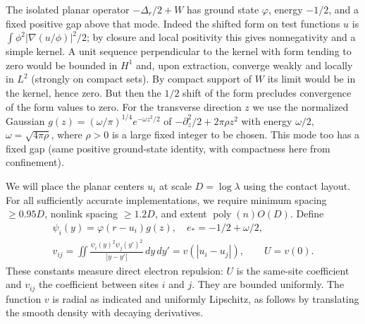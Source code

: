 The isolated planar operator \(-\Delta_r/2+W\) has ground state \(\varphi\), energy \(-1/2\), and a fixed positive gap above that mode. Indeed the shifted form on test functions \(u\) is \(\int \phi^2 |\nabla(u/\phi)|^2/2\); by closure and local positivity this gives nonnegativity and a simple kernel. A unit sequence perpendicular to the kernel with form tending to zero would be bounded in \(H^1\) and, upon extraction, converge weakly and locally in \(L^2\) (strongly on compact sets). By compact support of \(W\) its limit would be in the kernel, hence zero. But then the \(1/2\) shift of the form precludes convergence of the form values to zero. For the transverse direction \(z\) we use the normalized Gaussian \(g(z)=(\omega/\pi)^{1/4}e^{-\omega z^2/2}\) of \(-\partial_z^2/2+2\pi\rho z^2\) with energy \(\omega/2\), \(\omega=\sqrt{4\pi\rho}\), where \(\rho>0\) is a large fixed integer to be chosen. This mode too has a fixed gap (same positive ground-state identity, with compactness here from confinement).

We will place the planar centers \(u_i\) at scale \(D=\log\lambda\) using the contact layout. For all sufficiently accurate implementations, we require minimum spacing \(\ge0.95D\), nonlink spacing \(\ge1.2D\), and extent \(\operatorname{poly}(n) O(D)\). Define
\[
 \begin{gathered}
 \psi_i(y)=\varphi(r-u_i) g(z),\quad e_*=-1/2+\omega/2,\\
 v_{ij}=\iint\frac{\psi_i(y)^2\psi_j(y')^2}{|y-y'|}\,dy\,dy'
       =v(|u_i-u_j|),\qquad U=v(0).
 \end{gathered}
\]
These constants measure direct electron repulsion: $U$ is the same-site
coefficient and $v_{ij}$ the coefficient between sites $i$ and $j$.
They are bounded uniformly. The function \(v\) is radial as indicated
and uniformly Lipschitz, as follows by translating the smooth density
with decaying derivatives.

